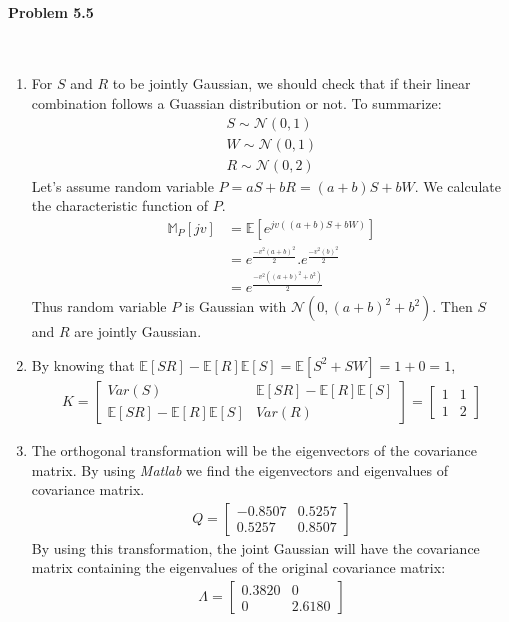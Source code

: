 \documentclass[12pt, letterpaper]{scrartcl}
\begin{document}
\paragraph*{Problem 5.5} \hfill\\
\begin{enumerate}[((a))]
    \item For $S$ and $R$ to be jointly Gaussian, we should check that if their linear combination follows a Guassian distribution or not.
    To summarize:
    \begin{align*}
        S\sim \mathcal{N}(0,1)\\
        W\sim \mathcal{N}(0,1)\\
        R\sim \mathcal{N}(0,2)
    \end{align*}
    Let's assume random variable $P=aS+bR=(a+b)S+bW$. We calculate the characteristic function of $P$.
    \begin{align*}
        \mathbb{M}_{P}[jv]&=\mathbb{E}[e^{jv((a+b)S+bW)}]\\
        &=e^{\frac{-v^2(a+b)^2}{2}}.e^{\frac{-v^2(b)^2}{2}}\\
        &=e^{\frac{-v^2((a+b)^2+b^2)}{2}}
    \end{align*}
    Thus random variable $P$ is Gaussian with $\mathcal{N}(0,(a+b)^2+b^2)$. Then $S$ and $R$ are jointly Gaussian.
    
    \item
    By knowing that $\mathbb{E}[SR]-\mathbb{E}[R]\mathbb{E}[S] = \mathbb{E}[S^2+SW]=1+0=1$, 
    \begin{align*}
        K=
        \begin{bmatrix}
            Var(S) & \mathbb{E}[SR]-\mathbb{E}[R]\mathbb{E}[S] \\
            \mathbb{E}[SR]-\mathbb{E}[R]\mathbb{E}[S] & Var(R)
        \end{bmatrix}
        =
        \begin{bmatrix}
            1 & 1 \\
            1 & 2
        \end{bmatrix}
    \end{align*}
    
    \item
    The orthogonal transformation will be the eigenvectors of the covariance matrix. By using \emph{Matlab} we find the eigenvectors and eigenvalues of covariance matrix.
    \begin{align*}
        Q=
        \begin{bmatrix}
            -0.8507 & 0.5257 \\
            0.5257 & 0.8507
        \end{bmatrix}
    \end{align*}
    By using this transformation, the joint Gaussian will have the covariance matrix containing the eigenvalues of the original covariance matrix:
    \begin{align*}
        \Lambda=
        \begin{bmatrix}
            0.3820 & 0 \\
            0 & 2.6180
        \end{bmatrix}
    \end{align*}
\end{enumerate}
\end{document}

